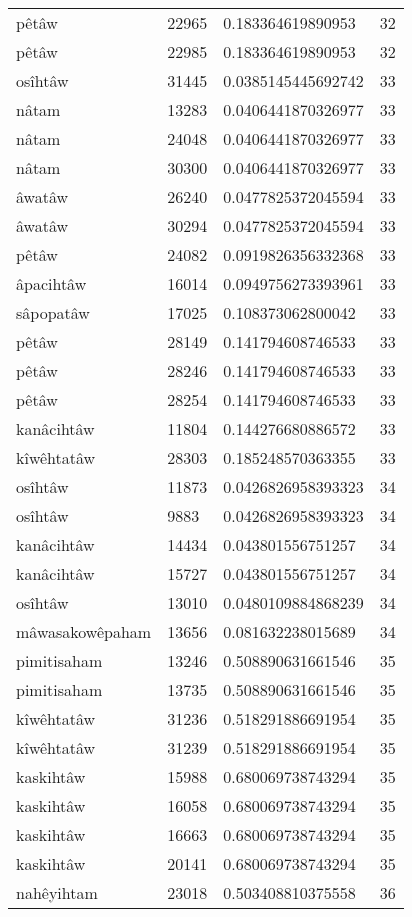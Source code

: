 \begin{longtable}{llll}
pêtâw & 22965 & 0.183364619890953 & 32 \\
pêtâw & 22985 & 0.183364619890953 & 32 \\
osîhtâw & 31445 & 0.0385145445692742 & 33 \\
nâtam & 13283 & 0.0406441870326977 & 33 \\
nâtam & 24048 & 0.0406441870326977 & 33 \\
nâtam & 30300 & 0.0406441870326977 & 33 \\
âwatâw & 26240 & 0.0477825372045594 & 33 \\
âwatâw & 30294 & 0.0477825372045594 & 33 \\
pêtâw & 24082 & 0.0919826356332368 & 33 \\
âpacihtâw & 16014 & 0.0949756273393961 & 33 \\
sâpopatâw & 17025 & 0.108373062800042 & 33 \\
pêtâw & 28149 & 0.141794608746533 & 33 \\
pêtâw & 28246 & 0.141794608746533 & 33 \\
pêtâw & 28254 & 0.141794608746533 & 33 \\
kanâcihtâw & 11804 & 0.144276680886572 & 33 \\
kîwêhtatâw & 28303 & 0.185248570363355 & 33 \\
osîhtâw & 11873 & 0.0426826958393323 & 34 \\
osîhtâw & 9883 & 0.0426826958393323 & 34 \\
kanâcihtâw & 14434 & 0.043801556751257 & 34 \\
kanâcihtâw & 15727 & 0.043801556751257 & 34 \\
osîhtâw & 13010 & 0.0480109884868239 & 34 \\
mâwasakowêpaham & 13656 & 0.081632238015689 & 34 \\
pimitisaham & 13246 & 0.508890631661546 & 35 \\
pimitisaham & 13735 & 0.508890631661546 & 35 \\
kîwêhtatâw & 31236 & 0.518291886691954 & 35 \\
kîwêhtatâw & 31239 & 0.518291886691954 & 35 \\
kaskihtâw & 15988 & 0.680069738743294 & 35 \\
kaskihtâw & 16058 & 0.680069738743294 & 35 \\
kaskihtâw & 16663 & 0.680069738743294 & 35 \\
kaskihtâw & 20141 & 0.680069738743294 & 35 \\
nahêyihtam & 23018 & 0.503408810375558 & 36 \\

\end{longtable}
